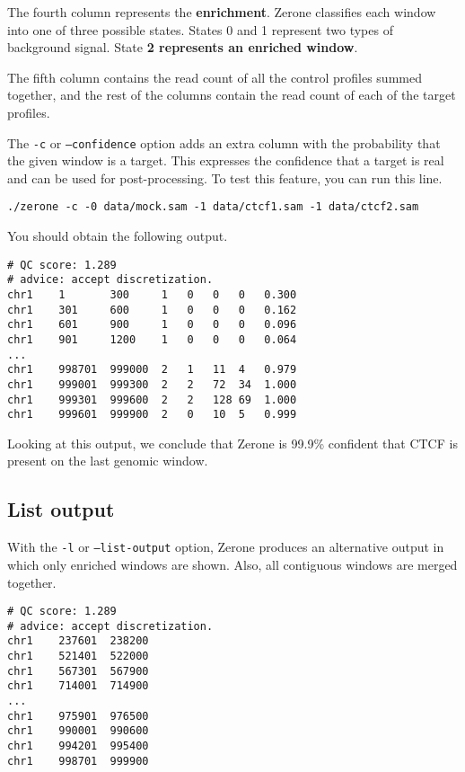 \documentclass[12pt]{article}
\begin{document}
\begin{mdframed}
The fourth column represents the \textbf{enrichment}. Zerone classifies
each window into one of three possible states. States 0 and 1 represent two
types of background signal. State \textbf{2 represents an enriched window}.
\end{mdframed}

The fifth column contains the read count of all the control profiles summed
together, and the rest of the columns contain the read count of each of the
target profiles.

\pagebreak

The \texttt{-c} or \texttt{--confidence} option adds an extra column
with the probability that the given window is a target. This expresses the
confidence that a target is real and can be used for post-processing. To
test this feature, you can run this line.

\begin{verbatim}
./zerone -c -0 data/mock.sam -1 data/ctcf1.sam -1 data/ctcf2.sam
\end{verbatim}

You should obtain the following output.

\begin{verbatim}
# QC score: 1.289
# advice: accept discretization.
chr1    1       300     1   0   0   0   0.300
chr1    301     600     1   0   0   0   0.162
chr1    601     900     1   0   0   0   0.096
chr1    901     1200    1   0   0   0   0.064
...
chr1    998701  999000  2   1   11  4   0.979
chr1    999001  999300  2   2   72  34  1.000
chr1    999301  999600  2   2   128 69  1.000
chr1    999601  999900  2   0   10  5   0.999
\end{verbatim}

Looking at this output, we conclude that Zerone is 99.9\% confident
that CTCF is present on the last genomic window.

\subsection{List output}

With the \texttt{-l} or \texttt{--list-output} option, Zerone produces an
alternative output in which only enriched windows are shown. Also, all
contiguous windows are merged together.

\begin{verbatim}
# QC score: 1.289
# advice: accept discretization.
chr1    237601  238200
chr1    521401  522000
chr1    567301  567900
chr1    714001  714900
...
chr1    975901  976500
chr1    990001  990600
chr1    994201  995400
chr1    998701  999900
\end{verbatim}
\end{document}
